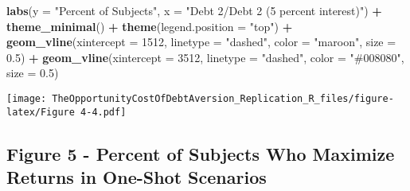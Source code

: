 \documentclass[
]{article}
\newenvironment{Shaded}{\begin{snugshade}}{\end{snugshade}}
\newcommand{\AttributeTok}[1]{\textcolor[rgb]{0.13,0.29,0.53}{#1}}
\newcommand{\DecValTok}[1]{\textcolor[rgb]{0.00,0.00,0.81}{#1}}
\newcommand{\FloatTok}[1]{\textcolor[rgb]{0.00,0.00,0.81}{#1}}
\newcommand{\FunctionTok}[1]{\textcolor[rgb]{0.13,0.29,0.53}{\textbf{#1}}}
\newcommand{\NormalTok}[1]{#1}
\newcommand{\SpecialCharTok}[1]{\textcolor[rgb]{0.81,0.36,0.00}{\textbf{#1}}}
\newcommand{\StringTok}[1]{\textcolor[rgb]{0.31,0.60,0.02}{#1}}
\begin{document}
\begin{Shaded}
\begin{Highlighting}[]
  \FunctionTok{labs}\NormalTok{(}\AttributeTok{y =} \StringTok{"Percent of Subjects"}\NormalTok{, }\AttributeTok{x =} \StringTok{"Debt 2/Debt 2 (5 percent interest)"}\NormalTok{) }\SpecialCharTok{+}
  \FunctionTok{theme\_minimal}\NormalTok{() }\SpecialCharTok{+}
  \FunctionTok{theme}\NormalTok{(}\AttributeTok{legend.position =} \StringTok{"top"}\NormalTok{) }\SpecialCharTok{+}
  \FunctionTok{geom\_vline}\NormalTok{(}\AttributeTok{xintercept =} \DecValTok{1512}\NormalTok{, }\AttributeTok{linetype =} \StringTok{"dashed"}\NormalTok{, }\AttributeTok{color =} \StringTok{"maroon"}\NormalTok{, }\AttributeTok{size =} \FloatTok{0.5}\NormalTok{) }\SpecialCharTok{+}
  \FunctionTok{geom\_vline}\NormalTok{(}\AttributeTok{xintercept =} \DecValTok{3512}\NormalTok{, }\AttributeTok{linetype =} \StringTok{"dashed"}\NormalTok{, }\AttributeTok{color =} \StringTok{"\#008080"}\NormalTok{, }\AttributeTok{size =} \FloatTok{0.5}\NormalTok{)}
\end{Highlighting}
\end{Shaded}

\texttt{[image: TheOpportunityCostOfDebtAversion\_Replication\_R\_files/figure-latex/Figure 4-4.pdf]}

\subsection{Figure 5 - Percent of Subjects Who Maximize Returns in
One-Shot
Scenarios}\label{figure-5---percent-of-subjects-who-maximize-returns-in-one-shot-scenarios}
\end{document}
